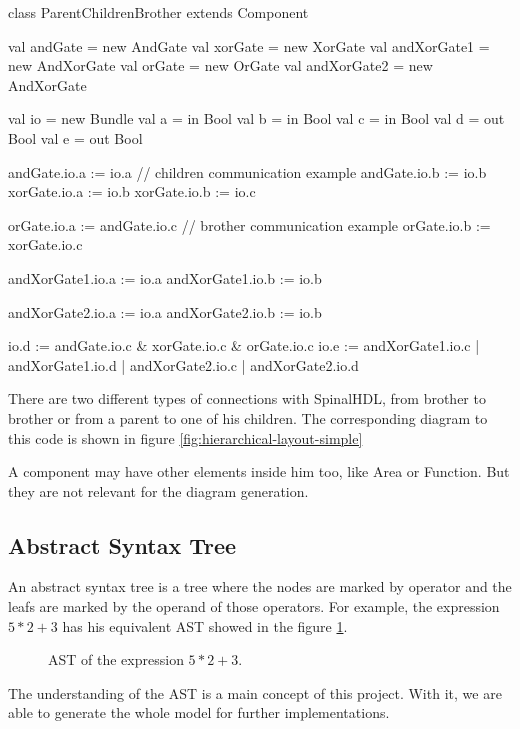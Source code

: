 \begin{listing}
    \centering
    \begin{scalacode}
    class ParentChildrenBrother extends Component
    {
        val andGate = new AndGate
        val xorGate = new XorGate
        val andXorGate1 = new AndXorGate
        val orGate = new OrGate
        val andXorGate2 = new AndXorGate

        val io = new Bundle
        {
            val a = in Bool
            val b = in Bool
            val c = in Bool
            val d = out Bool
            val e = out Bool
        }

        andGate.io.a := io.a            // children communication example
        andGate.io.b := io.b
        xorGate.io.a := io.b
        xorGate.io.b := io.c

        orGate.io.a := andGate.io.c     // brother communication example
        orGate.io.b := xorGate.io.c     

        andXorGate1.io.a := io.a
        andXorGate1.io.b := io.b

        andXorGate2.io.a := io.a
        andXorGate2.io.b := io.b

        io.d := andGate.io.c & xorGate.io.c & orGate.io.c
        io.e := andXorGate1.io.c | andXorGate1.io.d | andXorGate2.io.c | andXorGate2.io.d
    }
    \end{scalacode}
    \caption[Type of connection in SpinalHDL]{There are two different types of
connections with SpinalHDL, from brother to brother or from a parent to
one of his children. The corresponding diagram to this code is shown in figure
\ref{fig:hierarchical-layout-simple}}
    \label{lst:HierarchicComponent-solo}
\end{listing}

A component may have other elements inside him too, like Area or Function. But
they are not relevant for the diagram generation.

\subsection{Abstract Syntax Tree}
\label{sub:Abstract Syntax Tree}

An abstract syntax tree is a tree where the nodes are marked by operator and the
leafs are marked by the operand of those operators. For example, the expression $5
* 2 + 3$ has his equivalent AST showed in the figure \ref{fig:ast-example}.

\begin{figure}[H]
    \centering
    \caption[Example of an AST]{AST of the expression $5 * 2 + 3$.}
    \label{fig:ast-example}
  \end{figure}

The understanding of the AST is a main concept of this project. With it, we are
able to generate the whole model for further implementations.

